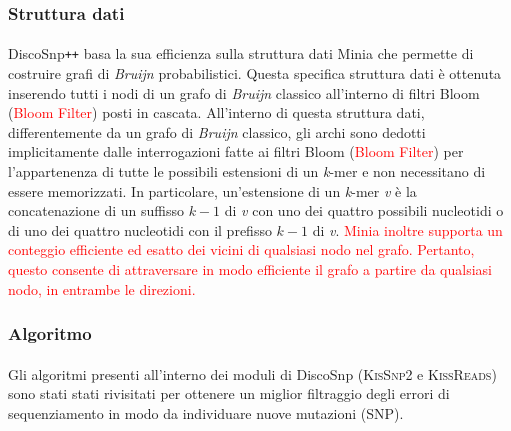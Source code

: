 \documentclass[../main.tex]{subfiles}
\begin{document}
\subsubsection{Struttura dati}

\paragraph{} DiscoSnp\texttt{++} basa la sua efficienza sulla struttura dati Minia \cite{chikhi2013space} che permette di costruire grafi di \textit{Bruijn} probabilistici. Questa specifica struttura dati è ottenuta inserendo tutti i nodi di un grafo di \textit{Bruijn} classico all'interno di filtri Bloom (\textcolor{red}{Bloom Filter}) posti in cascata. All'interno di questa struttura dati, differentemente da un grafo di \textit{Bruijn} classico, gli archi sono dedotti implicitamente dalle interrogazioni fatte ai filtri Bloom (\textcolor{red}{Bloom Filter}) per l'appartenenza di tutte le possibili estensioni di un \textit{k}-mer e non necessitano di essere memorizzati. In particolare, un'estensione di un \textit{k}-mer \textit{v} è la concatenazione di un suffisso $\textit{k}-1$ di \textit{v} con uno dei quattro possibili nucleotidi o di uno dei quattro nucleotidi con il prefisso  $\textit{k}-1$ di \textit{v}. \textcolor{red}{Minia inoltre supporta un conteggio efficiente ed esatto dei vicini di qualsiasi nodo nel grafo. Pertanto, questo consente di attraversare in modo efficiente il grafo a partire da qualsiasi nodo, in entrambe le direzioni.}

\subsubsection{Algoritmo}

\paragraph{} Gli algoritmi presenti all'interno dei moduli di DiscoSnp (\textsc{KisSnp2} e \textsc{KissReads}) sono stati stati rivisitati per ottenere un miglior filtraggio degli errori di sequenziamento in modo da individuare nuove mutazioni (SNP). 
\end{document}
